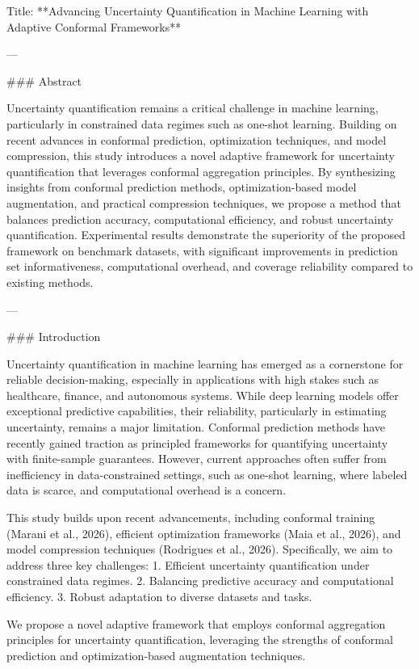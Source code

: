 Title: **Advancing Uncertainty Quantification in Machine Learning with Adaptive Conformal Frameworks**

---

### Abstract

Uncertainty quantification remains a critical challenge in machine learning, particularly in constrained data regimes such as one-shot learning. Building on recent advances in conformal prediction, optimization techniques, and model compression, this study introduces a novel adaptive framework for uncertainty quantification that leverages conformal aggregation principles. By synthesizing insights from conformal prediction methods, optimization-based model augmentation, and practical compression techniques, we propose a method that balances prediction accuracy, computational efficiency, and robust uncertainty quantification. Experimental results demonstrate the superiority of the proposed framework on benchmark datasets, with significant improvements in prediction set informativeness, computational overhead, and coverage reliability compared to existing methods.

---

### Introduction

Uncertainty quantification in machine learning has emerged as a cornerstone for reliable decision-making, especially in applications with high stakes such as healthcare, finance, and autonomous systems. While deep learning models offer exceptional predictive capabilities, their reliability, particularly in estimating uncertainty, remains a major limitation. Conformal prediction methods have recently gained traction as principled frameworks for quantifying uncertainty with finite-sample guarantees. However, current approaches often suffer from inefficiency in data-constrained settings, such as one-shot learning, where labeled data is scarce, and computational overhead is a concern.

This study builds upon recent advancements, including conformal training (Marani et al., 2026), efficient optimization frameworks (Maia et al., 2026), and model compression techniques (Rodrigues et al., 2026). Specifically, we aim to address three key challenges:
1. Efficient uncertainty quantification under constrained data regimes.
2. Balancing predictive accuracy and computational efficiency.
3. Robust adaptation to diverse datasets and tasks.

We propose a novel adaptive framework that employs conformal aggregation principles for uncertainty quantification, leveraging the strengths of conformal prediction and optimization-based augmentation techniques.

